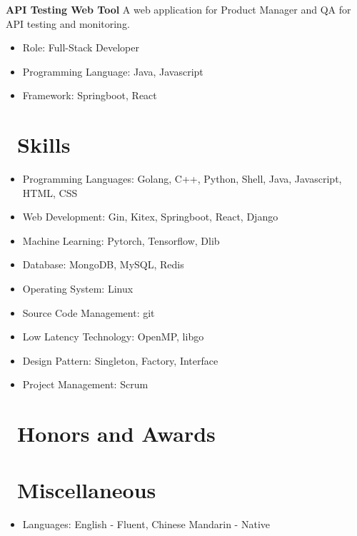 \documentclass{resume}
\begin{document}
\textbf{API Testing Web Tool}
\newline
A web application for Product Manager and QA for API testing and monitoring.
\begin{itemize}
  \item Role: Full-Stack Developer
  \item Programming Language: Java, Javascript
  \item Framework: Springboot, React
\end{itemize}


\section{\faCogs\ Skills}
\begin{itemize}[parsep=0.5ex]
  \item Programming Languages: Golang, C++, Python, Shell, Java, Javascript, HTML, CSS
  \item Web Development: Gin, Kitex, Springboot, React, Django
  \item Machine Learning: Pytorch, Tensorflow, Dlib
  \item Database: MongoDB, MySQL, Redis
  \item Operating System: Linux
  \item Source Code Management: git
  \item Low Latency Technology: OpenMP, libgo
  \item Design Pattern: Singleton, Factory, Interface
  \item Project Management: Scrum
\end{itemize}

\section{\faHeartO\ Honors and Awards}

\section{\faInfo\ Miscellaneous}
\begin{itemize}[parsep=0.5ex]
  \item Languages: English - Fluent, Chinese Mandarin - Native
\end{itemize}

%
%
\end{document}
